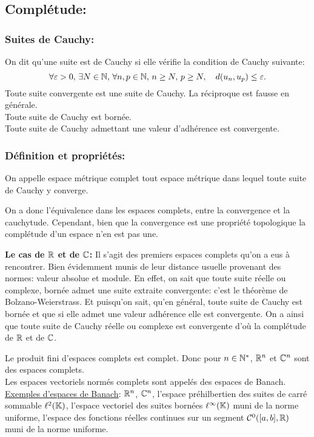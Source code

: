 \documentclass[12pt,a4paper]{article}
\begin{document}
	\subsection{Complétude:}
	\subsubsection{Suites de Cauchy:} On dit qu'une suite est de Cauchy si elle vérifie la condition de Cauchy suivante:
	\[  \forall \varepsilon >0, \, \exists N\in \mathbb{N}, \, \forall n,p \in \mathbb{N},\, n\geq N,\, p\geq N, \quad d(u_n,u_p)\leq\varepsilon    .\]
	Toute suite convergente est une suite de Cauchy. La réciproque est fausse en générale.\\
	Toute suite de Cauchy est bornée.\\
	Toute suite de Cauchy admettant une valeur d'adhérence est convergente.
	
	\subsubsection{Définition et propriétés:} On appelle espace métrique complet tout espace métrique dans lequel toute suite de Cauchy y converge.
	\par On a donc l'équivalence dans les espaces complets, entre la convergence et la cauchytude. Cependant, bien que la convergence est une propriété topologique la complétude d'un espace n'en est pas une.
	\par \textbf{Le cas de $\mathbb{R}$ et de $\mathbb{C}$:}
	Il s'agit des premiers espaces complets qu'on a eus à rencontrer. Bien évidemment munis de leur distance usuelle provenant des normes: valeur absolue et module. En effet, on sait que toute suite réelle ou complexe, bornée admet une suite extraite convergente: c'est le théorème de Bolzano-Weierstrass. Et puisqu'on sait, qu'en général, toute suite de Cauchy est bornée et que si elle admet une valeur adhérence elle est convergente. On a ainsi que toute suite de Cauchy réelle ou complexe est convergente d'où la complétude de $\mathbb{R}$ et de $\mathbb{C}$.
	\par Le produit fini d'espaces complets est complet. Donc pour $n\in \mathbb{N}^*$, $\mathbb{R}^n$ et $\mathbb{C}^n$ sont des espaces complets.\\
	Les espaces vectoriels normés complets sont appelés des espaces de Banach.\\
	\underline{Exemples d'espaces de Banach}: $\mathbb{R}^n$, $\mathbb{C}^n$, l'espace préhilbertien des suites de carré sommable $\ell^2(\mathbb{K})$, l'espace vectoriel des suites bornées $\ell^{\infty}(\mathbb{K})$ muni de la norme uniforme, l'espace des fonctions réelles continues sur un segment $\mathcal{C}^0([a,b],\mathbb{R}) $ muni de la norme uniforme.
	
\end{document}
